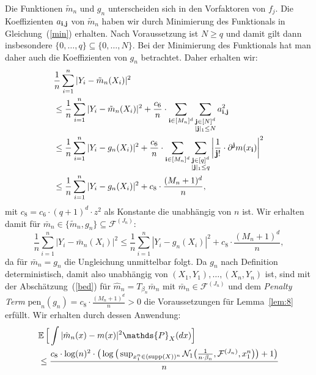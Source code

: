 {Die Funktionen $\tilde{m}_n$ und $g_n$ unterscheiden sich in den Vorfaktoren von $f_j$. Die Koeffizienten $a_{\mathbf{i},\mathbf{j}}$ von $\tilde{m}_n$ haben wir durch Minimierung des Funktionals in Gleichung~(\ref{min}) erhalten. Nach Voraussetzung ist $N \geq q$ und damit gilt dann insbesondere $\{0,\dots,q\} \subseteq \{0,\dots,N\}$. Bei der Minimierung des Funktionals hat man daher auch die Koeffizienten von $g_n$ betrachtet. Daher erhalten wir:
\begin{equation}
\begin{split}
\label{tilde}
& \frac{1}{n} \sum_{i = 1}^n|Y_i - \tilde{m}_n(X_i)|^2 \\
& \leq \frac{1}{n} \sum_{i = 1}^n|Y_i - \tilde{m}_n(X_i)|^2 + \frac{c_6}{n} \cdot \sum_{\mathbf{i} \in [M_n]^d} \sum_{\substack{ \mathbf{j} \in [N]^d \\ |\mathbf{j}|_1 \leq N}} a_{\mathbf{i},\mathbf{j}}^2 \\
& \leq \frac{1}{n} \sum_{i = 1}^n|Y_i - g_n(X_i)|^2 + \frac{c_6}{n} \cdot \sum_{\mathbf{i} \in [M_n]^d} \sum_{\substack{ \mathbf{j} \in [q]^d \\ |\mathbf{j}|_1 \leq q}} \bigg|\frac{1}{\mathbf{j}!} \cdot \partial^{\mathbf{j}}m(x_{\mathbf{i}})\bigg|^2 \\
& \leq \frac{1}{n} \sum_{i = 1}^n|Y_i - g_n(X_i)|^2 + c_{8} \cdot \frac{(M_n + 1)^d}{n},
\end{split}
\end{equation}
mit $c_{8} = c_6 \cdot (q + 1)^d \cdot z^2$ als Konstante die unabhängig von $n$ ist.
Wir erhalten damit für $\bar{m}_n \in \{\tilde{m}_n, g_n\} \subseteq \mathcal{F}^{(J_n)}$:
\begin{equation}
\label{bed}
\frac{1}{n} \sum_{i = 1}^n|Y_i - \bar{m}_n(X_i)|^2 \leq \frac{1}{n} \sum_{i = 1}^n|Y_i - g_n(X_i)|^2 + c_8 \cdot \frac{(M_n + 1)^d}{n},
\end{equation}
da für $\bar{m}_n = g_n$ die Ungleichung unmittelbar folgt.
Da $g_n$ nach Definition deterministisch, damit also unabhängig von $(X_1, Y_1),\dots,(X_n, Y_n)$ ist, sind mit der Abschätzung~(\ref{bed}) für $\hat{m}_n = T_{\beta_n}\bar{m}_n$ mit $\bar{m}_n \in \mathcal{F}^{(J_n)}$ und dem \emph{Penalty Term} $\mathrm{pen}_n(g_{n}) = c_8 \cdot \frac{(M_n + 1)^d}{n} > 0$ die Voraussetzungen für Lemma~\ref{lem:8} erfüllt. Wir erhalten durch dessen Anwendung:
\begin{equation}
\label{eq:lem8}
\begin{split}
& \E \Big[\int |\hat{m}_n(x) - m(x)|^2 \mathds{P}_X(dx)\Big] \\
& \leq \frac{c_8 \cdot \log(n)^2 \cdot \big(\log\big(\sup_{x_1^n \in (\supp(X))^n}\mathcal{N}_1\big(\frac{1}{n \cdot \beta_n},\mathcal{F}^{(J_n)},x_1^n\big)\big) + 1\big)}{n} \\

\end{split}
\end{equation}}

